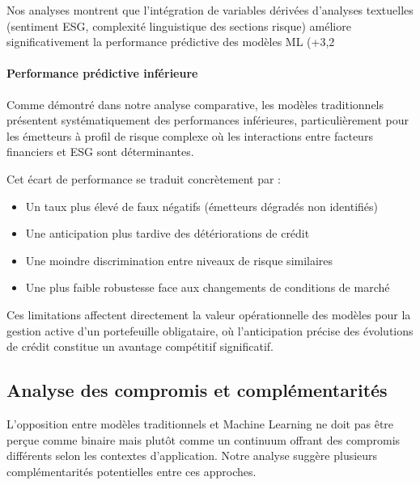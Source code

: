 Nos analyses montrent que l'intégration de variables dérivées d'analyses textuelles (sentiment ESG, complexité linguistique des sections risque) améliore significativement la performance prédictive des modèles ML (+3,2%

\paragraph{Performance prédictive inférieure}

Comme démontré dans notre analyse comparative, les modèles traditionnels présentent systématiquement des performances inférieures, particulièrement pour les émetteurs à profil de risque complexe où les interactions entre facteurs financiers et ESG sont déterminantes.

Cet écart de performance se traduit concrètement par :
\begin{itemize}
    \item Un taux plus élevé de faux négatifs (émetteurs dégradés non identifiés)
    \item Une anticipation plus tardive des détériorations de crédit
    \item Une moindre discrimination entre niveaux de risque similaires
    \item Une plus faible robustesse face aux changements de conditions de marché
\end{itemize}

Ces limitations affectent directement la valeur opérationnelle des modèles pour la gestion active d'un portefeuille obligataire, où l'anticipation précise des évolutions de crédit constitue un avantage compétitif significatif.

\subsection{Analyse des compromis et complémentarités}

L'opposition entre modèles traditionnels et Machine Learning ne doit pas être perçue comme binaire mais plutôt comme un continuum offrant des compromis différents selon les contextes d'application. Notre analyse suggère plusieurs complémentarités potentielles entre ces approches.

